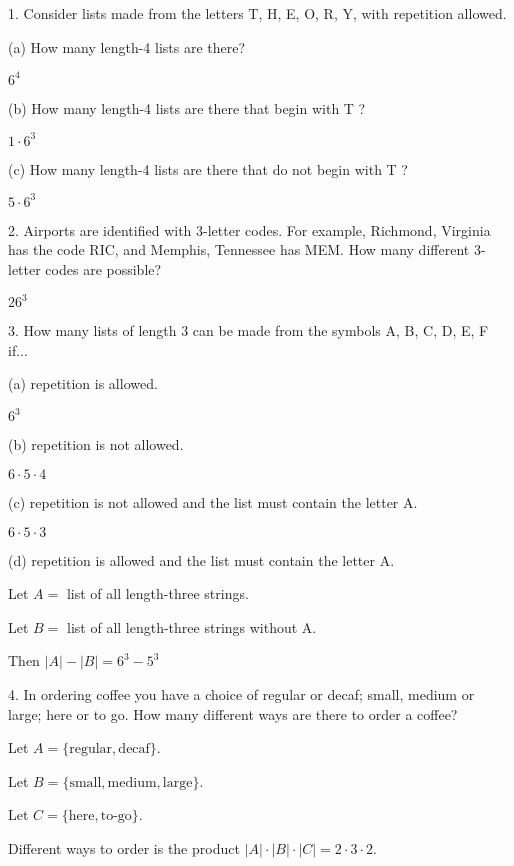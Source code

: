 \documentclass{idrisMemo}
\begin{document}
\toc

\begin{prooflist} {1.  Consider lists made from the letters T, H, E, O, R, Y,
    with repetition allowed.}
    \item (a) How many length-4 lists are there?
    \item $ 6^4$
    \item (b) How many length-4 lists are there that begin with T ?
    \item $ 1 \cdot 6^3$
    \item (c) How many length-4 lists are there that do not begin with T ?
    \item $ 5 \cdot 6^3$
\end{prooflist}

\begin{prooflist} {2. Airports are identified with 3-letter codes. For example,
    Richmond, Virginia has the code RIC, and Memphis, Tennessee has MEM. How
many different 3-letter codes are possible?}
    \item $ 26^3$
\end{prooflist}

\begin{prooflist} {3. How many lists of length 3 can be made from the symbols A,
    B, C, D, E, F if...}
    \item (a) repetition is allowed.
    \item $ 6^3$
    \item (b) repetition is not allowed.
    \item $ 6\cdot 5 \cdot 4$
    \item (c) repetition is not allowed and the list must contain the letter A.
    \item $ 6\cdot 5 \cdot 3$
    \item (d) repetition is allowed and the list must contain the letter A.
    \item Let $A=$ list of all length-three strings.
    \item Let $B=$ list of all length-three strings without A.
    \item Then $|A| - |B| = 6^3 - 5^3$
\end{prooflist}

\begin{prooflist}{ 4. In ordering coffee you have a choice of regular or decaf;
    small, medium or large; here or to go. How many different ways are there to
order a coffee? }
\item Let $A = \{\text{regular}, \text{decaf}\}$.
\item Let $B = \{\text{small}, \text{medium}, \text{large}\}$.
\item Let $C = \{\text{here}, \text{to-go}\}$.
\item Different ways to order is the product $|A|\cdot|B|\cdot|C| = 2 \cdot 3
    \cdot 2$.
\end{prooflist}
\end{document}
